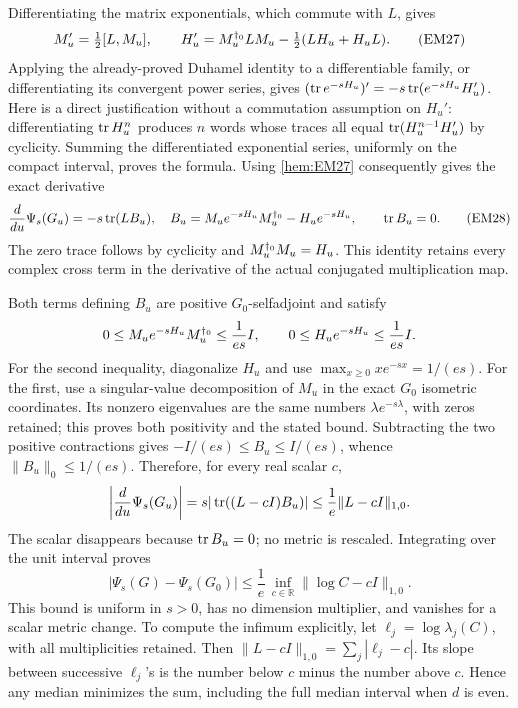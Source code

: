 Differentiating the matrix exponentials, which commute with \(L\), gives
\begin{equation}
 M_u'=\tfrac12[L,M_u],\qquad
 H_u'=M_u^{\dagger_0}LM_u-\tfrac12(LH_u+H_uL).
 \tag{EM27}\label{hem:EM27}
\end{equation}
Applying the already-proved Duhamel identity to a differentiable family,
or differentiating its convergent power series, gives
\((\operatorname{tr} e^{-sH_u})'=-s\operatorname{tr}(e^{-sH_u}H_u')\).
Here is a direct justification without a commutation assumption on
\(H_u'\): differentiating \(\operatorname{tr} H_u^n\) produces \(n\) words whose traces
all equal \(\operatorname{tr}(H_u^{n-1}H_u')\) by cyclicity. Summing the differentiated
exponential series, uniformly on the compact interval, proves the formula.
Using \eqref{hem:EM27} consequently gives the exact derivative
\begin{equation}
 \frac{d}{du}\Psi_s(G_u)
  =-s\operatorname{tr}(L B_u),\quad
 B_u=M_u e^{-sH_u}M_u^{\dagger_0}-H_u e^{-sH_u},
 \qquad \operatorname{tr} B_u=0.
 \tag{EM28}\label{hem:EM28}
\end{equation}
The zero trace follows by cyclicity and \(M_u^{\dagger_0}M_u=H_u\).
This identity retains every complex cross term in the derivative of
the actual conjugated multiplication map.

Both terms defining \(B_u\) are positive \(G_0\)-selfadjoint and satisfy
\[
 0\le M_u e^{-sH_u}M_u^{\dagger_0}\le\frac1{es}I,\qquad
 0\le H_u e^{-sH_u}\le\frac1{es}I.
\]
For the second inequality, diagonalize \(H_u\) and use
\(\max_{x\ge0}x e^{-sx}=1/(es)\).
For the first, use a singular-value decomposition of \(M_u\) in the
exact \(G_0\) isometric coordinates. Its nonzero eigenvalues are
the same numbers \(\lambda e^{-s\lambda}\), with zeros retained;
this proves both positivity and the stated bound.
Subtracting the two positive contractions gives
\(-I/(es)\le B_u\le I/(es)\), whence \(\|B_u\|_0\le1/(es)\).
Therefore, for every real scalar \(c\),
\[
 \left|\frac{d}{du}\Psi_s(G_u)\right|
  =s|\operatorname{tr}((L-cI)B_u)|
  \le\frac1e\|L-cI\|_{1,0}.
\]
The scalar disappears because \(\operatorname{tr} B_u=0\); no metric is rescaled.
Integrating over the unit interval proves
\begin{equation}
 |\Psi_s(G)-\Psi_s(G_0)|
 \le\frac1e\,\inf_{c\in\mathbb R}\|\log C-cI\|_{1,0}.
 \tag{EM29}\label{hem:EM29}
\end{equation}
This bound is uniform in \(s>0\), has no dimension multiplier, and
vanishes for a scalar metric change. To compute the infimum explicitly,
let \(\ell_j=\log\lambda_j(C)\), with all multiplicities retained.
Then \(\|L-cI\|_{1,0}=\sum_j|\ell_j-c|\). Its slope between successive
\(\ell_j\)'s is the number below \(c\) minus the number above \(c\).
Hence any median minimizes the sum, including the full median interval
when \(d\) is even.

